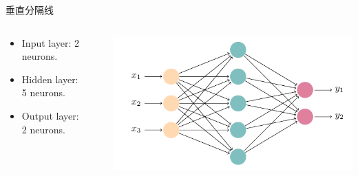 \documentclass{ctexbeamer}
\begin{document}
\begin{frame}{垂直分隔线}
  \begin{columns}
  \begin{column}{0.49\textwidth}
    \begin{itemize}
      \item Input layer: 2 neurons.
      \item Hidden layer: 5 neurons.
      \item Output layer: 2 neurons.
    \end{itemize}
  \end{column}

  \begin{column}{.02\textwidth}
    \rule{.1mm}{0.7\textheight}
  \end{column}

  \begin{column}{0.49\textwidth}
    \includegraphics[width=\textwidth]{neural-networks.pdf}
  \end{column}
  \end{columns}
\end{frame}
\end{document}
